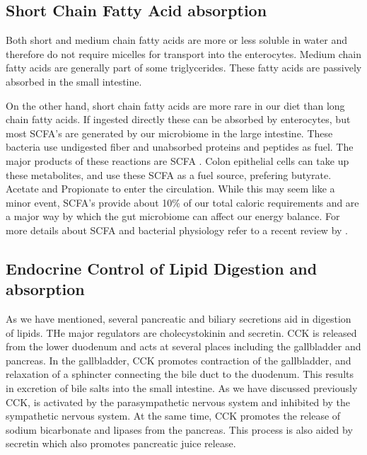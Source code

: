 \documentclass{tufte-handout}
\begin{document}
\subsection{Short Chain Fatty Acid absorption}

Both short and medium chain fatty acids are more or less soluble in water and therefore do not require micelles for transport into the enterocytes.  Medium chain fatty acids are generally part of some triglycerides.  These fatty acids are passively absorbed in the small intestine.

  On the other hand, short chain fatty acids are more rare in our diet than long chain fatty acids.  If ingested directly these can be absorbed by enterocytes, but most SCFA's are generated by our microbiome in the large intestine.  These bacteria use undigested fiber and unabsorbed proteins and peptides as fuel.  The major products of these reactions are SCFA \citep{Cummings1987}.  Colon epithelial cells can take up these metabolites, and use these SCFA as a fuel source, prefering butyrate.  Acetate and Propionate to enter the circulation.  While this may seem like a minor event, SCFA's provide about 10\% of our total caloric requirements and are a major way by which the gut microbiome can affect our energy balance.  For more details about SCFA and bacterial physiology refer to a recent review by \citet{Koh2016}.

\subsection{Endocrine Control of Lipid Digestion and absorption}

As we have mentioned, several pancreatic and biliary secretions aid in digestion of lipids.  THe major regulators are cholecystokinin and secretin.  CCK is released from the lower duodenum and acts at several places including the gallbladder and pancreas.  In the gallbladder, CCK promotes contraction of the gallbladder, and relaxation of a sphincter connecting the bile duct to the duodenum.  This results in excretion of bile salts into the small intestine.  As we have discussed previously CCK, is activated by the parasympathetic nervous system and inhibited by the sympathetic nervous system.  At the same time, CCK promotes the release of sodium bicarbonate and lipases from the pancreas.  This process is also aided by secretin which also promotes pancreatic juice release.
\end{document}
